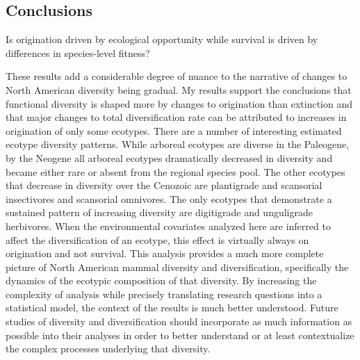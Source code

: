 \documentclass[12pt,letterpaper]{article}
\begin{document}
\subsection*{Conclusions}

Is origination driven by ecological opportunity while survival is driven by differences in species-level fitness?

These results add a considerable degree of nuance to the narrative of changes to North American diversity being gradual. My results support the conclusions that functional diversity is shaped more by changes to origination than extinction and that major changes to total diversification rate can be attributed to increases in origination of only some ecotypes. There are a number of interesting estimated ecotype diversity patterns. While arboreal ecotypes are diverse in the Paleogene, by the Neogene all arboreal ecotypes dramatically decreased in diversity and became either rare or absent from the regional species pool. The other ecotypes that decrease in diversity over the Cenozoic are plantigrade and scansorial insectivores and scansorial omnivores. The only ecotypes that demonstrate a sustained pattern of increasing diversity are digitigrade and unguligrade herbivores. When the environmental covariates analyzed here are inferred to affect the diversification of an ecotype, this effect is virtually always on origination and not survival. This analysis provides a much more complete picture of North American mammal diversity and diversification, specifically the dynamics of the ecotypic composition of that diversity. By increasing the complexity of analysis while precisely translating research questions into a statistical model, the context of the results is much better understood. Future studies of diversity and diversification should incorporate as much information as possible into their analyses in order to better understand or at least contextualize the complex processes underlying that diversity.
\end{document}
